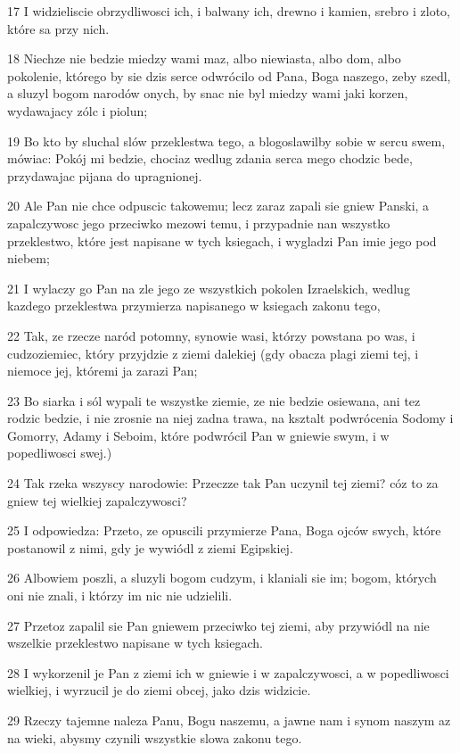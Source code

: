 \par 17 I widzieliscie obrzydliwosci ich, i balwany ich, drewno i kamien, srebro i zloto, które sa przy nich.
\par 18 Niechze nie bedzie miedzy wami maz, albo niewiasta, albo dom, albo pokolenie, którego by sie dzis serce odwrócilo od Pana, Boga naszego, zeby szedl, a sluzyl bogom narodów onych, by snac nie byl miedzy wami jaki korzen, wydawajacy zólc i piolun;
\par 19 Bo kto by sluchal slów przeklestwa tego, a blogoslawilby sobie w sercu swem, mówiac: Pokój mi bedzie, chociaz wedlug zdania serca mego chodzic bede, przydawajac pijana do upragnionej.
\par 20 Ale Pan nie chce odpuscic takowemu; lecz zaraz zapali sie gniew Panski, a zapalczywosc jego przeciwko mezowi temu, i przypadnie nan wszystko przeklestwo, które jest napisane w tych ksiegach, i wygladzi Pan imie jego pod niebem;
\par 21 I wylaczy go Pan na zle jego ze wszystkich pokolen Izraelskich, wedlug kazdego przeklestwa przymierza napisanego w ksiegach zakonu tego,
\par 22 Tak, ze rzecze naród potomny, synowie wasi, którzy powstana po was, i cudzoziemiec, który przyjdzie z ziemi dalekiej (gdy obacza plagi ziemi tej, i niemoce jej, któremi ja zarazi Pan;
\par 23 Bo siarka i sól wypali te wszystke ziemie, ze nie bedzie osiewana, ani tez rodzic bedzie, i nie zrosnie na niej zadna trawa, na ksztalt podwrócenia Sodomy i Gomorry, Adamy i Seboim, które podwrócil Pan w gniewie swym, i w popedliwosci swej.)
\par 24 Tak rzeka wszyscy narodowie: Przeczze tak Pan uczynil tej ziemi? cóz to za gniew tej wielkiej zapalczywosci?
\par 25 I odpowiedza: Przeto, ze opuscili przymierze Pana, Boga ojców swych, które postanowil z nimi, gdy je wywiódl z ziemi Egipskiej.
\par 26 Albowiem poszli, a sluzyli bogom cudzym, i klaniali sie im; bogom, których oni nie znali, i którzy im nic nie udzielili.
\par 27 Przetoz zapalil sie Pan gniewem przeciwko tej ziemi, aby przywiódl na nie wszelkie przeklestwo napisane w tych ksiegach.
\par 28 I wykorzenil je Pan z ziemi ich w gniewie i w zapalczywosci, a w popedliwosci wielkiej, i wyrzucil je do ziemi obcej, jako dzis widzicie.
\par 29 Rzeczy tajemne naleza Panu, Bogu naszemu, a jawne nam i synom naszym az na wieki, abysmy czynili wszystkie slowa zakonu tego.

